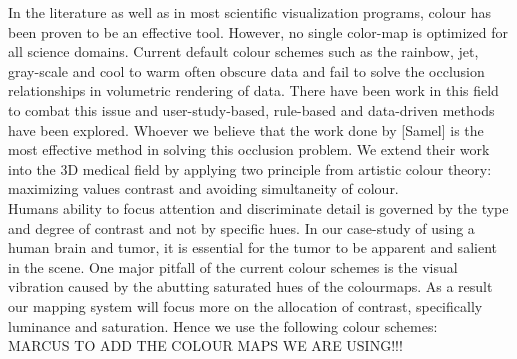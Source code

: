 In the literature as well as in most scientific visualization programs, colour has been proven to be an effective tool.  However, no single color-map is optimized for all science domains.  Current default colour schemes such as the rainbow, jet, gray-scale and cool to warm often obscure data and fail to solve the occlusion relationships in volumetric rendering of data.  There have been work in this field to combat this issue and user-study-based, rule-based and data-driven methods have been explored.  Whoever we believe that the work done by [Samel] is the most effective method in solving this occlusion problem.  We extend their work into the 3D medical field by applying two principle from artistic colour theory: maximizing values contrast and avoiding simultaneity of colour.\\

Humans ability to focus attention and discriminate detail is governed by the type and degree of contrast and not by specific hues.  In our case-study of using a human brain and tumor, it is essential for the tumor to be apparent and salient in the scene.  One major pitfall of the current colour schemes is the visual vibration caused by the abutting saturated hues of the colourmaps.  As a result our mapping system will focus more on the allocation of contrast, specifically luminance and saturation. Hence we use the following colour schemes:\\

MARCUS TO ADD THE COLOUR MAPS WE ARE USING!!!


